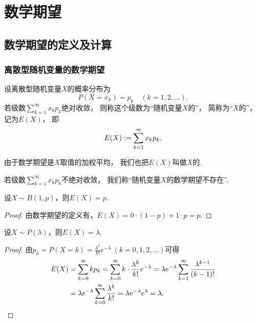 \section{数学期望}
\subsection{数学期望的定义及计算}
\subsubsection{离散型随机变量的数学期望}
\begin{definition}
设离散型随机变量\(X\)的概率分布为\begin{equation*}
	P(X=x_k) = p_k
	\quad(k=1,2,\dotsc).
\end{equation*}
若级数\(\sum_{k=1}^\infty x_k p_k\)绝对收敛，
则称这个级数为“随机变量\(X\)的”，
简称为“\(X\)的”，
记为\(E(X)\)，
即\begin{equation}\label{equation:随机变量的数字特征.离散型数学期望的定义式}
	E(X) := \sum_{k=1}^\infty x_k p_k.
\end{equation}

由于数学期望是\(X\)取值的加权平均，
我们也把\(E(X)\)叫做\(X\)的.

若级数\(\sum_{k=1}^\infty x_k p_k\)不绝对收敛，
我们称“随机变量\(X\)的数学期望不存在”.
\end{definition}

\begin{proposition}\label{theorem:随机变量的数字特征.0-1分布的数学期望}
设\(X \sim B(1,p)\)，则\(E(X) = p\).
\begin{proof}
由数学期望的定义有，\(E(X) = 0 \cdot (1-p) + 1 \cdot p = p\).
\end{proof}
\end{proposition}

\begin{proposition}\label{theorem:随机变量的数字特征.泊松分布的数学期望}
设\(X \sim P(\lambda)\)，则\(E(X) = \lambda\).
\begin{proof}
由\(p_k = P(X=k) = \frac{\lambda^k}{k!} e^{-\lambda}\ (k=0,1,2,\dotsc)\)可得
\begin{align*}
	E(X) &= \sum_{k=0}^\infty k p_k
	= \sum_{k=0}^\infty k \cdot \frac{\lambda^k}{k!} e^{-\lambda}
	= \lambda e^{-\lambda} \sum_{k=1}^\infty \frac{\lambda^{k-1}}{(k-1)!} \\
	&= \lambda e^{-\lambda} \sum_{k=0}^\infty \frac{\lambda^k}{k!}
	= \lambda e^{-\lambda} e^\lambda
	= \lambda.
	\qedhere
\end{align*}
\end{proof}
\end{proposition}

